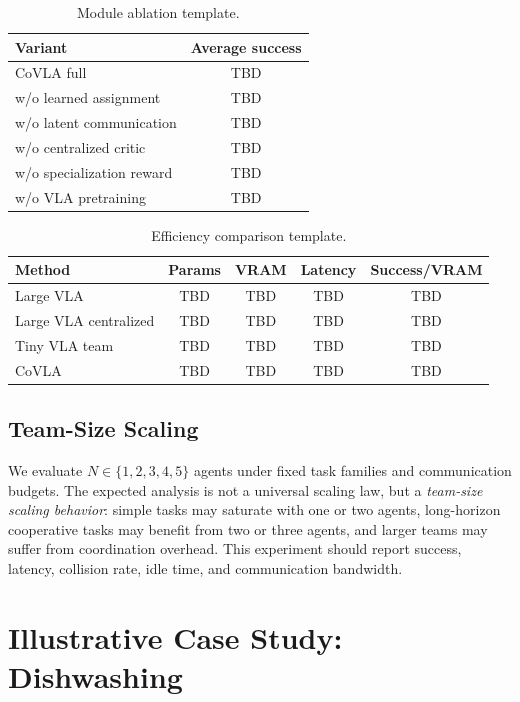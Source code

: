 \documentclass[11pt]{article}
\newcommand{\method}{CoVLA}
\begin{document}
\begin{table}[t]
\centering
\caption{Module ablation template.}
\label{tab:ablation}
\begin{tabular}{lc}
\toprule
Variant & Average success \\
\midrule
\method{} full & TBD \\
w/o learned assignment & TBD \\
w/o latent communication & TBD \\
w/o centralized critic & TBD \\
w/o specialization reward & TBD \\
w/o VLA pretraining & TBD \\
\bottomrule
\end{tabular}
\end{table}

\begin{table}[t]
\centering
\caption{Efficiency comparison template.}
\label{tab:efficiency}
\begin{tabular}{lcccc}
\toprule
Method & Params & VRAM & Latency & Success/VRAM \\
\midrule
Large VLA & TBD & TBD & TBD & TBD \\
Large VLA centralized & TBD & TBD & TBD & TBD \\
Tiny VLA team & TBD & TBD & TBD & TBD \\
\method{} & TBD & TBD & TBD & TBD \\
\bottomrule
\end{tabular}
\end{table}

\subsection{Team-Size Scaling}
We evaluate $N \in \{1,2,3,4,5\}$ agents under fixed task families and communication budgets. The expected analysis is not a universal scaling law, but a \emph{team-size scaling behavior}: simple tasks may saturate with one or two agents, long-horizon cooperative tasks may benefit from two or three agents, and larger teams may suffer from coordination overhead. This experiment should report success, latency, collision rate, idle time, and communication bandwidth.

\section{Illustrative Case Study: Dishwashing}
\end{document}
